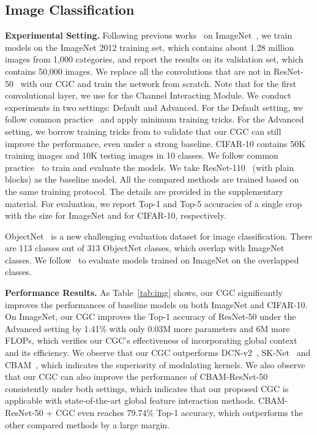 \documentclass[runningheads]{llncs}
\begin{document}
\begin{table*}[t]
\end{table*}



\subsection{Image Classification}
\label{sec:image}
\textbf{Experimental Setting.} Following previous works~\cite{He_2016_CVPR} on ImageNet~\cite{russakovsky2015imagenet}, we train models on the ImageNet 2012 training set, which contains about 1.28 million images from 1,000 categories, and report the results on its validation set, which contains 50,000 images. We replace all the convolutions that are not  in ResNet-50~\cite{He_2016_CVPR} with our CGC and train the network from scratch. Note that for the first convolutional layer, we use  for the Channel Interacting Module. We conduct experiments in two settings: Default and Advanced. For the Default setting, we follow common practice~\cite{He_2016_CVPR} and apply minimum training tricks. For the Advanced setting, we borrow training tricks from \cite{he2019bag} to validate that our CGC can still improve the performance, even under a strong baseline. CIFAR-10 contains 50K training images and 10K testing images in 10 classes. We follow common practice~\cite{he2016identity} to train and evaluate the models. We take ResNet-110~\cite{he2016identity} (with plain blocks) as the baseline model. All the compared methods are trained based on the same training protocol. The details are provided in the supplementary material. For evaluation, we report Top-1 and Top-5 accuracies of a single crop with the size  for ImageNet and  for CIFAR-10, respectively.

ObjectNet~\cite{barbu2019objectnet} is a new challenging evaluation dataset for image classification. There are 113 classes out of 313 ObjectNet classes, which overlap with ImageNet classes. We follow~\cite{barbu2019objectnet} to evaluate models trained on ImageNet on the overlapped classes.





\textbf{Performance Results.}
As Table~\ref{tab:img} shows, our CGC significantly improves the performances of baseline models on both ImageNet and CIFAR-10. On ImageNet, our CGC improves the Top-1 accuracy of ResNet-50 under the Advanced setting by 1.41\% with only 0.03M more parameters and 6M more FLOPs, which verifies our CGC's effectiveness of incorporating global context and its efficiency. We observe that our CGC outperforms DCN-v2~\cite{zhu2019deformable}, SK-Net~\cite{li2019selective} and CBAM~\cite{woo2018cbam}, which indicates the superiority of modulating kernels. We also observe that our CGC can also improve the performance of CBAM-ResNet-50~\cite{woo2018cbam} consistently under both settings, which indicates that our proposed CGC is applicable with state-of-the-art global feature interaction methods. CBAM-ResNet-50 + CGC even reaches 79.74\% Top-1 accuracy, which outperforms the other compared methods by a large margin.
\end{document}

